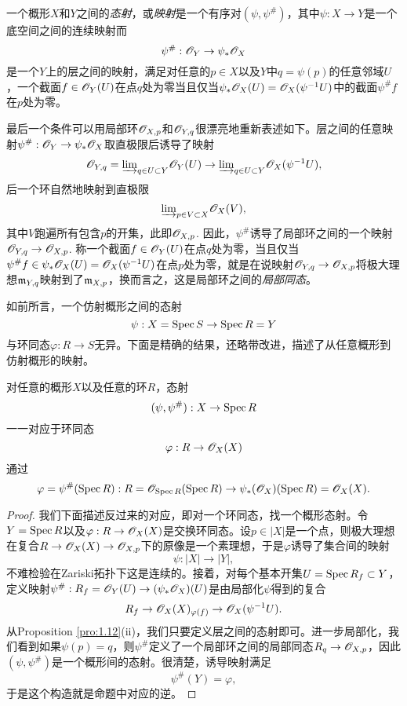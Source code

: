 \begin{defi}
一个概形$X$和$Y$之间的\textit{态射}，或\textit{映射}是一个有序对$(\psi,\psi^\#)$，其中$\psi:X\to Y$是一个底空间之间的连续映射而
\[
	\psi^\#:\mathscr{O}_Y\to \psi_*\mathscr{O}_X
\]
是一个$Y$上的层之间的映射，满足对任意的$p\in X$以及$Y$中$q=\psi(p)$的任意邻域$U$，一个截面$f\in\mathscr{O}_Y(U)$在点$q$处为零当且仅当$\psi_*\mathscr{O}_X(U)=\mathscr{O}_X(\psi^{-1}U)$中的截面$\psi^\# f$在$p$处为零。
\end{defi}

最后一个条件可以用局部环$\mathscr{O}_{X,p}$和$\mathscr{O}_{Y,q}$很漂亮地重新表述如下。层之间的任意映射$\psi^\#:\mathscr{O}_Y\to \psi_* \mathscr{O}_X$取直极限后诱导了映射
\[
	\mathscr{O}_{Y,q}={\varinjlim}_{q\in U\subset Y}\mathscr{O}_Y(U)\to {\varinjlim}_{q\in U\subset Y}\mathscr{O}_X(\psi^{-1}U),
\]
后一个环自然地映射到直极限
\[
	{\varinjlim}_{p\in V\subset X}\mathscr{O}_X(V),
\]
其中$V$跑遍所有包含$p$的开集，此即$\mathscr{O}_{X,p}$. 因此，$\psi^\#$诱导了局部环之间的一个映射$\mathscr{O}_{Y,q}\to \mathscr{O}_{X,p}$. 称一个截面$f\in \mathscr{O}_Y(U)$在点$q$处为零，当且仅当$\psi^\# f\in \psi_*\mathscr{O}_X(U)=\mathscr{O}_X(\psi^{-1}U)$在点$p$处为零，就是在说映射$\mathscr{O}_{Y,q}\to \mathscr{O}_{X,p}$将极大理想$\mathfrak{m}_{Y,q}$映射到了$\mathfrak{m}_{X,p}$，换而言之，这是局部环之间的\textit{局部同态}。

如前所言，一个仿射概形之间的态射
\[
	\psi:X=\operatorname{Spec} S\to\operatorname{Spec} R=Y
\]
与环同态$\varphi:R\to S$无异。下面是精确的结果，还略带改进，描述了从任意概形到仿射概形的映射。

\begin{thm}\label{thm:1.40}
对任意的概形$X$以及任意的环$R$，态射
\[
	(\psi,\psi^\#):X\to \operatorname{Spec} R
\]
一一对应于环同态
\[
	\varphi:R\to \mathscr{O}_X(X)
\]
通过
\[
	\varphi=\psi^\#(\operatorname{Spec} R):R=\mathscr{O}_{\operatorname{Spec} R}(\operatorname{Spec} R)\to \psi_*(\mathscr{O}_X)(\operatorname{Spec} R)=\mathscr{O}_X(X).
\]
\end{thm}

\begin{proof}
我们下面描述反过来的对应，即对一个环同态，找一个概形态射。令$Y=\operatorname{Spec} R$以及$\varphi:R\to \mathscr{O}_X(X)$是交换环同态。设$p\in |X|$是一个点，则极大理想在复合$R\to \mathscr{O}_X(X)\to \mathscr{O}_{X,p}$下的原像是一个素理想，于是$\varphi$诱导了集合间的映射
\[
	\psi:|X|\to |Y|,
\]
不难检验在Zariski拓扑下这是连续的。接着，对每个基本开集$U=\operatorname{Spec} R_f\subset Y$，定义映射$\psi^\#:R_f=\mathscr{O}_Y(U)\to (\psi_*\mathscr{O}_X)(U)$是由局部化$\psi$得到的复合
\[
	R_f\to \mathscr{O}_X(X)_{\varphi(f)}\to \mathscr{O}_X(\psi^{-1}U).
\]
从Proposition \ref{pro:1.12}(ii)，我们只要定义层之间的态射即可。进一步局部化，我们看到如果$\psi(p)=q$，则$\psi^\#$定义了一个局部环之间的局部同态$R_q\to \mathscr{O}_{X,p}$，因此$(\psi,\psi^\#)$是一个概形间的态射。很清楚，诱导映射满足
\[
	\psi^\#(Y)=\varphi,
\]
于是这个构造就是命题中对应的逆。
\end{proof}

